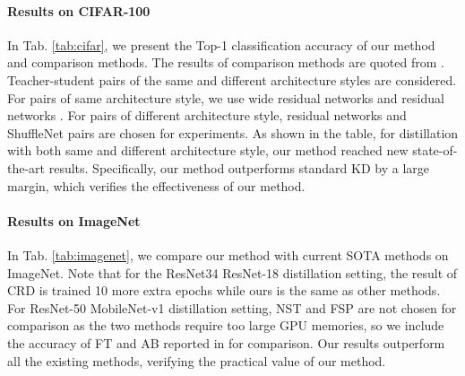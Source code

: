 \documentclass{article} \usepackage{iclr2021_conference,times}
\begin{document}
\paragraph{Results on CIFAR-100}
In Tab. \ref{tab:cifar}, we present the Top-1 classification accuracy of our method and comparison methods. The results of comparison methods are quoted from \citet{Tian2020Contrastive}. 
Teacher-student pairs of the same and different architecture styles are considered.
For pairs of same architecture style, we use wide residual networks \citep{ZagoruykoK17} and residual networks \citep{he2016deep}. For pairs of different architecture style, residual networks and ShuffleNet \citep{zhang2018shufflenet} pairs are chosen for experiments.
As shown in the table, for distillation with both same and different architecture style, our method reached new state-of-the-art results. 
Specifically, our method outperforms standard KD by a large margin, which verifies the effectiveness of our method. 


\paragraph{Results on ImageNet}
In Tab. \ref{tab:imagenet}, we compare our method with current SOTA methods on ImageNet. Note that for the ResNet34  ResNet-18 distillation setting, the result of CRD is trained 10 more extra epochs while ours is the same as other methods. 
For ResNet-50  MobileNet-v1 distillation setting, NST and FSP are not chosen for comparison as the two methods require too large GPU memories, so we include the accuracy of FT and AB reported in \citet{heo2019comprehensive} for comparison. 
Our results outperform all the existing methods, verifying the practical value of our method.
\end{document}
